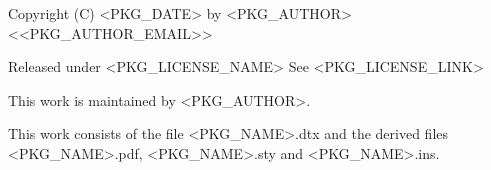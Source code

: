 \postamble
Copyright (C) <PKG_DATE> by
  <PKG_AUTHOR> <<PKG_AUTHOR_EMAIL>>

Released under <PKG_LICENSE_NAME>
See <PKG_LICENSE_LINK>

This work is maintained by
  <PKG_AUTHOR>.

This work consists of the file  <PKG_NAME>.dtx
          and the derived files <PKG_NAME>.pdf,
                                <PKG_NAME>.sty and
                                <PKG_NAME>.ins.

\endpostamble
